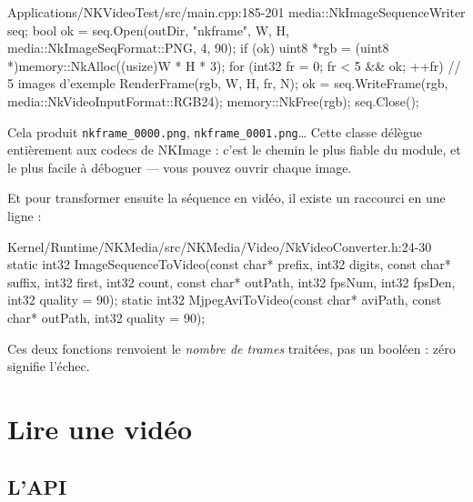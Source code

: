 \begin{nkcode}{Applications/NKVideoTest/src/main.cpp:185-201}
        media::NkImageSequenceWriter seq;
        bool ok = seq.Open(outDir, "nkframe", W, H, media::NkImageSeqFormat::PNG, 4, 90);
        if (ok) {
            uint8 *rgb = (uint8 *)memory::NkAlloc((usize)W * H * 3);
            for (int32 fr = 0; fr < 5 && ok; ++fr) { // 5 images d'exemple
                RenderFrame(rgb, W, H, fr, N);
                ok = seq.WriteFrame(rgb, media::NkVideoInputFormat::RGB24);
            }
            memory::NkFree(rgb);
            seq.Close();
        }
\end{nkcode}

Cela produit \texttt{nkframe\_0000.png}, \texttt{nkframe\_0001.png}\dots{} Cette
classe délègue entièrement aux codecs de NKImage : c'est le chemin le plus fiable
du module, et le plus facile à déboguer — vous pouvez ouvrir chaque image.

Et pour transformer ensuite la séquence en vidéo, il existe un raccourci en une
ligne :

\begin{nkcode}{Kernel/Runtime/NKMedia/src/NKMedia/Video/NkVideoConverter.h:24-30}
static int32 ImageSequenceToVideo(const char* prefix, int32 digits, const char* suffix,
                                  int32 first, int32 count, const char* outPath,
                                  int32 fpsNum, int32 fpsDen, int32 quality = 90);
static int32 MjpegAviToVideo(const char* aviPath, const char* outPath, int32 quality = 90);
\end{nkcode}

Ces deux fonctions renvoient le \emph{nombre de trames} traitées, pas un
booléen : zéro signifie l'échec.

\section{Lire une vidéo}

\subsection{L'API}

